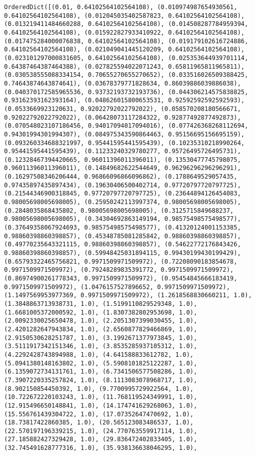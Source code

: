 \documentclass[11pt]{article}
\begin{document}
\begin{Verbatim}[commandchars=\\\{\}]
OrderedDict([(0.01, 0.64102564102564108), (0.010974987654930561, 0.64102564102564108), (0.012045035402587823, 0.64102564102564108), (0.013219411484660288, 0.64102564102564108), (0.014508287784959394, 0.64102564102564108), (0.015922827933410922, 0.64102564102564108), (0.017475284000076838, 0.64102564102564108), (0.019179102616724886, 0.64102564102564108), (0.021049041445120209, 0.64102564102564108), (0.023101297000831605, 0.64102564102564108), (0.025353644939701114, 0.64387464387464388), (0.027825594022071243, 0.65811965811965811), (0.030538555088334154, 0.70655270655270652), (0.033516026509388425, 0.74643874643874641), (0.03678379771828634, 0.86039886039886038), (0.040370172585965536, 0.93732193732193736), (0.044306214575838825, 0.93162393162393164), (0.048626015800653531, 0.92592592592592593), (0.0533669923120631, 0.92022792022792022), (0.058570208180566671, 0.92022792022792022), (0.06428073117284322, 0.92877492877492873), (0.070548023107186456, 0.94017094017094016), (0.077426368268112694, 0.94301994301994307), (0.084975343590864463, 0.95156695156695159), (0.093260334688321997, 0.95441595441595439), (0.10235310218990264, 0.95441595441595439), (0.11233240329780277, 0.95726495726495731), (0.12328467394420665, 0.96011396011396011), (0.13530477745798075, 0.96011396011396011), (0.14849682622544649, 0.96296296296296291), (0.16297508346206444, 0.96866096866096862), (0.1788649529057435, 0.97435897435897434), (0.19630406500402714, 0.97720797720797725), (0.21544346900318845, 0.97720797720797725), (0.23644894126454083, 0.98005698005698005), (0.25950242113997374, 0.98005698005698005), (0.2848035868435802, 0.98005698005698005), (0.3125715849688237, 0.98005698005698005), (0.34304692863149194, 0.98575498575498577), (0.37649358067924693, 0.98575498575498577), (0.41320124001153385, 0.98860398860398857), (0.45348785081285842, 0.98860398860398857), (0.49770235643321115, 0.98860398860398857), (0.54622772176843426, 0.98860398860398857), (0.59948425031894115, 0.99430199430199429), (0.65793322465756821, 0.9971509971509972), (0.72208090183854678, 0.9971509971509972), (0.79248289835391772, 0.9971509971509972), (0.86974900261778343, 0.9971509971509972), (0.95454845666183419, 0.9971509971509972), (1.0476157527896652, 0.9971509971509972), (1.1497569953977369, 0.9971509971509972), (1.2618568830660211, 1.0), (1.3848863713938731, 1.0), (1.5199110829529348, 1.0), (1.6681005372000592, 1.0), (1.8307382802953698, 1.0), (2.0092330025650478, 1.0), (2.2051307399030455, 1.0), (2.4201282647943834, 1.0), (2.6560877829466869, 1.0), (2.9150530628251787, 1.0), (3.1992671377973845, 1.0), (3.5111917342151346, 1.0), (3.8535285937105312, 1.0), (4.2292428743894988, 1.0), (4.641588833612782, 1.0), (5.0941380148163802, 1.0), (5.5908101825122287, 1.0), (6.1359072734131761, 1.0), (6.7341506577508286, 1.0), (7.3907220335257824, 1.0), (8.1113083078968717, 1.0), (8.902150854450392, 1.0), (9.7700995729922564, 1.0), (10.722672220103243, 1.0), (11.768119524349991, 1.0), (12.915496650148841, 1.0), (14.174741629268063, 1.0), (15.556761439304722, 1.0), (17.07352647470692, 1.0), (18.73817422860385, 1.0), (20.565123083486537, 1.0), (22.570197196339215, 1.0), (24.770763559917114, 1.0), (27.185882427329428, 1.0), (29.836472402833405, 1.0), (32.745491628777316, 1.0), (35.938136638046295, 1.0), 
\end{Verbatim}
\end{document}
